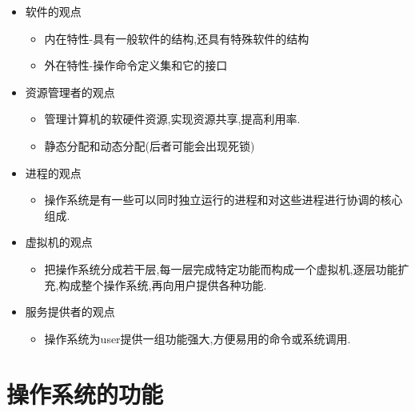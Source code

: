 \documentclass[a4paper,10pt,notitlepage]{article}
\begin{document}
\begin{itemize}

	\item 软件的观点
	\begin{itemize}
		\item 内在特性-具有一般软件的结构,还具有特殊软件的结构
		\item 外在特性-操作命令定义集和它的接口
	\end{itemize}
	
	\item 资源管理者的观点
	\begin{itemize}
		\item 管理计算机的软硬件资源,实现资源共享,提高利用率.
		\item 静态分配和动态分配(后者可能会出现死锁)
	\end{itemize}
		
	\item 进程的观点
	\begin{itemize}
		\item 操作系统是有一些可以同时独立运行的进程和对这些进程进行协调的核心组成.
	\end{itemize}
		
	\item 虚拟机的观点
	\begin{itemize}
		\item 把操作系统分成若干层,每一层完成特定功能而构成一个虚拟机,逐层功能扩充,构成整个操作系统,再向用户提供各种功能.
	\end{itemize}
		
	\item 服务提供者的观点
	\begin{itemize}
		\item 操作系统为user提供一组功能强大,方便易用的命令或系统调用.
	\end{itemize}
	
\end{itemize}
	
\section{操作系统的功能}
\end{document}
